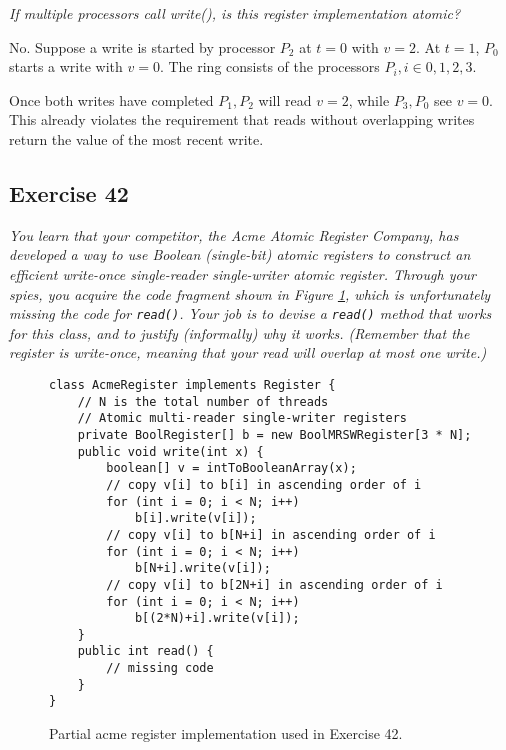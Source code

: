 \documentclass[a4paper,10pt]{article}
\begin{document}
\emph{If multiple processors call write(), is this register implementation atomic?}

\vspace{3mm}

No. Suppose a write is started by processor $P_2$ at $t = 0$ with $v = 2$. At
$t = 1$, $P_0$ starts a write with $v = 0$. The ring consists of the processors $P_i, i \in 0, 1, 2, 3$.

Once both writes have completed $P_1, P_2$ will read $v = 2$, while $P_3, P_0$ 
see $v = 0$. This already violates the requirement that reads without overlapping
writes return the value of the most recent write.

\subsection{Exercise 42}

\emph{You learn that your competitor, the Acme Atomic Register Company, has 
developed a way to use Boolean (single-bit) atomic registers to construct
an efficient write-once single-reader single-writer atomic register. Through your
spies, you acquire the code fragment shown in Figure \ref{fig:acmeregister}, which is unfortunately
missing the code for \lstinline|read()|. Your job is to devise a \lstinline|read()| method that works for
this class, and to justify (informally) why it works. (Remember that the register is
write-once, meaning that your read will overlap at most one write.)}

\begin{figure}
\begin{lstlisting}
class AcmeRegister implements Register {
    // N is the total number of threads
    // Atomic multi-reader single-writer registers
    private BoolRegister[] b = new BoolMRSWRegister[3 * N];
    public void write(int x) {
        boolean[] v = intToBooleanArray(x);
        // copy v[i] to b[i] in ascending order of i
        for (int i = 0; i < N; i++)
            b[i].write(v[i]);
        // copy v[i] to b[N+i] in ascending order of i
        for (int i = 0; i < N; i++)
            b[N+i].write(v[i]);
        // copy v[i] to b[2N+i] in ascending order of i
        for (int i = 0; i < N; i++)
            b[(2*N)+i].write(v[i]);
    }
    public int read() {
        // missing code
    }
}
\end{lstlisting}
\caption{Partial acme register implementation used in Exercise 42.}
\label{fig:acmeregister}
\end{figure}
\end{document}
